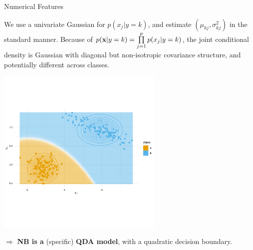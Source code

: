 \documentclass[11pt,compress,t,notes=noshow, xcolor=table]{beamer}
\begin{document}
\begin{vbframe}{Numerical Features}

We use a univariate Gaussian for $p(x_j | y=k)$, and estimate $(\mu_{kj}, \sigma^2_{kj})$ in the standard manner. Because of $p(\mathbf{x} | y= k) = \prod\limits_{j=1}^p p(x_j|y = k)$, the joint conditional density is Gaussian with diagonal but non-isotropic covariance structure, and potentially different across classes.

\lz

\begin{center}
\includegraphics[width=0.6\textwidth, clip = true, trim = {0 100 0 120}]{figure/nb-db.png} 
\end{center}

$\Rightarrow$  \textbf{NB is a} (specific) \textbf{QDA model}, with a quadratic decision boundary.

\end{vbframe}
\end{document}
